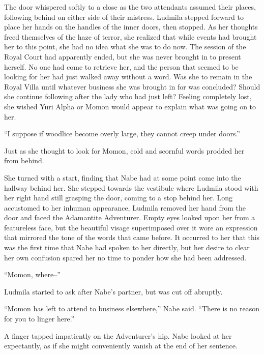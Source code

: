  

The door whispered softly to a close as the two attendants assumed their places, following behind on either side of their mistress. Ludmila stepped forward to place her hands on the handles of the inner doors, then stopped. As her thoughts freed themselves of the haze of terror, she realized that while events had brought her to this point, she had no idea what she was to do now. The session of the Royal Court had apparently ended, but she was never brought in to present herself. No one had come to retrieve her, and the person that seemed to be looking for her had just walked away without a word. Was she to remain in the Royal Villa until whatever business she was brought in for was concluded? Should she continue following after the lady who had just left? Feeling completely lost, she wished Yuri Alpha or Momon would appear to explain what was going on to her.

 

“I suppose if woodlice become overly large, they cannot creep under doors.”

 

Just as she thought to look for Momon, cold and scornful words prodded her from behind.

 

She turned with a start, finding that Nabe had at some point come into the hallway behind her. She stepped towards the vestibule where Ludmila stood with her right hand still grasping the door, coming to a stop behind her. Long accustomed to her inhuman appearance, Ludmila removed her hand from the door and faced the Adamantite Adventurer. Empty eyes looked upon her from a featureless face, but the beautiful visage superimposed over it wore an expression that mirrored the tone of the words that came before. It occurred to her that this was the first time that Nabe had spoken to her directly, but her desire to clear her own confusion spared her no time to ponder how she had been addressed.

 

“Momon, where–”

 

Ludmila started to ask after Nabe’s partner, but was cut off abruptly.

 

“Momon has left to attend to business elsewhere,” Nabe said. “There is no reason for you to linger here.”

 

A finger tapped impatiently on the Adventurer’s hip. Nabe looked at her expectantly, as if she might conveniently vanish at the end of her sentence.

